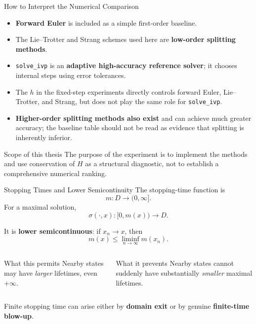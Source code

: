 \documentclass[aspectratio=169,11pt]{beamer}
\newcommand{\mstop}{m}
\newcommand{\flow}{\sigma}
\begin{document}
\begin{frame}{How to Interpret the Numerical Comparison}
\small
\begin{itemize}
  \item \textbf{Forward Euler} is included as a simple first-order baseline.
  \item The Lie--Trotter and Strang schemes used here are \textbf{low-order splitting methods}.
  \item \texttt{solve\_ivp} is an \textbf{adaptive high-accuracy reference solver}; it chooses internal steps using error tolerances.
  \item The \(h\) in the fixed-step experiments directly controls forward Euler, Lie--Trotter, and Strang, but does not play the same role for \texttt{solve\_ivp}.
  \item \textbf{Higher-order splitting methods also exist} and can achieve much greater accuracy; the baseline table should not be read as evidence that splitting is inherently inferior.
\end{itemize}

\begin{alertblock}{Scope of this thesis}
The purpose of the experiment is to implement the methods and use conservation of \(H\) as a structural diagnostic, not to establish a comprehensive numerical ranking.
\end{alertblock}
\end{frame}

\begin{frame}{Stopping Times and Lower Semicontinuity}
\small
The stopping-time function is
\[
\boxed{\mstop:D\to(0,\infty].}
\]
For a maximal solution,
\[
\flow(\cdot,x):[0,\mstop(x))\to D.
\]

It is \textbf{lower semicontinuous}: if \(x_n\to x\), then
\[
\boxed{\mstop(x)\le \liminf_{n\to\infty}\mstop(x_n).}
\]

\begin{columns}[T,onlytextwidth]
\begin{block}{What this permits}
Nearby states may have \emph{larger} lifetimes, even \(+\infty\).
\end{block}
\begin{alertblock}{What it prevents}
Nearby states cannot suddenly have substantially \emph{smaller} maximal lifetimes.
\end{alertblock}
\end{columns}

\vspace{0.2em}
Finite stopping time can arise either by \textbf{domain exit} or by genuine \textbf{finite-time blow-up}.
\end{frame}
\end{document}
